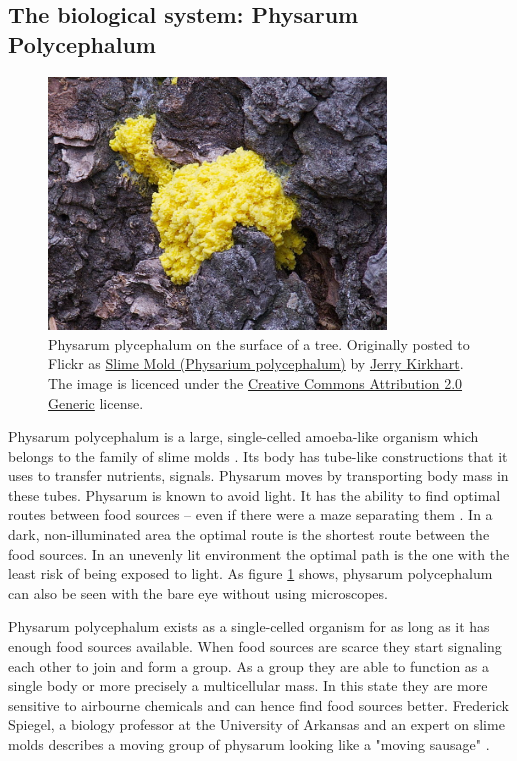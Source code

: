 \documentclass[cameraready]{IWORK2014}
\begin{document}
\subsection{The biological system: Physarum Polycephalum}

\begin{figure}
    \centering
    \includegraphics[width=0.8\textwidth]{physarum.jpg}
    \caption{ Physarum plycephalum on the surface of a tree. Originally posted to Flickr as \href{http://flickr.com/photos/33466410@N00/4988821189}{Slime Mold (Physarium polycephalum)} by \href{http://flickr.com/people/33466410@N00}{Jerry Kirkhart}. The image is licenced under the \href{http://creativecommons.org/licenses/by/2.0/deed.en}{Creative Commons Attribution 2.0 Generic} license.}
    \label{fig:physarum}
\end{figure}

Physarum polycephalum is a large, single-celled amoeba-like organism which belongs to the family of slime molds \cite{liu2012physarum}. Its body has tube-like constructions that it uses to transfer nutrients, signals. Physarum moves by transporting body mass in these tubes. Physarum is known to avoid light. It has the ability to find optimal routes between food sources -- even if there were a maze separating them \cite{nakagaki2000intelligence}. In a dark, non-illuminated area the optimal route is the shortest route between the food sources. In an unevenly lit environment the optimal path is the one with the least risk of being exposed to light. As figure \ref{fig:physarum} shows, physarum polycephalum can also be seen with the bare eye without using microscopes.

Physarum polycephalum exists as a single-celled organism for as long as it has enough food sources available. When food sources are scarce they start signaling each other to join and form a group. As a group they are able to function as a single body or more precisely a multicellular mass. In this state they are more sensitive to airbourne chemicals and can hence find food sources better. Frederick Spiegel, a biology professor at the University of Arkansas and an expert on slime molds describes a moving group of physarum looking like a "moving sausage" \cite{spiegel2012slimemold}.
\end{document}
